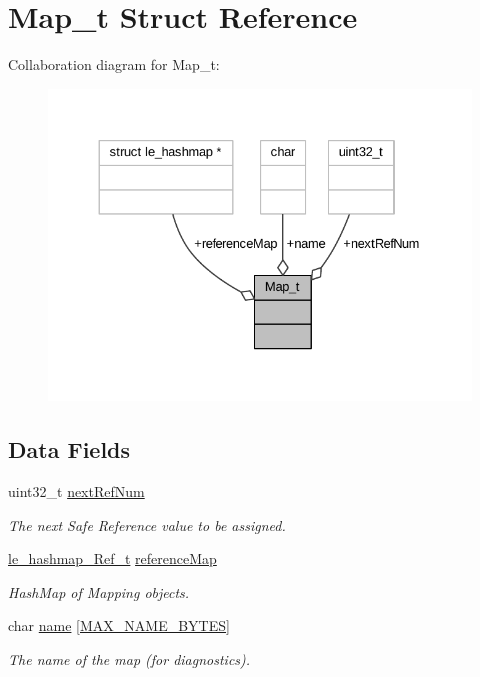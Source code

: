 \hypertarget{struct_map__t}{}\section{Map\+\_\+t Struct Reference}
\label{struct_map__t}


Collaboration diagram for Map\+\_\+t\+:
\nopagebreak
\begin{figure}[H]
\begin{center}
\leavevmode
\includegraphics[width=330pt]{struct_map__t__coll__graph}
\end{center}
\end{figure}
\subsection*{Data Fields}
\begin{DoxyCompactItemize}
\item 
uint32\+\_\+t \hyperlink{struct_map__t_ade5c144406b95d07307637ead975d0bc}{next\+Ref\+Num}
\begin{DoxyCompactList}\small\item\em The next Safe Reference value to be assigned. \end{DoxyCompactList}\item 
\hyperlink{le__hashmap_8h_ae81c60860dbdb8c59beaf25985e5605a}{le\+\_\+hashmap\+\_\+\+Ref\+\_\+t} \hyperlink{struct_map__t_a3c5e1ea038445888d1d690692d454006}{reference\+Map}
\begin{DoxyCompactList}\small\item\em Hash\+Map of Mapping objects. \end{DoxyCompactList}\item 
char \hyperlink{struct_map__t_af2b75dd4063f7b7fdfc94fb6df01d194}{name} \mbox{[}\hyperlink{safe_ref_8c_ab66a1b76292b571536c72e3795a5640d}{M\+A\+X\+\_\+\+N\+A\+M\+E\+\_\+\+B\+Y\+T\+ES}\mbox{]}
\begin{DoxyCompactList}\small\item\em The name of the map (for diagnostics). \end{DoxyCompactList}\end{DoxyCompactItemize}


